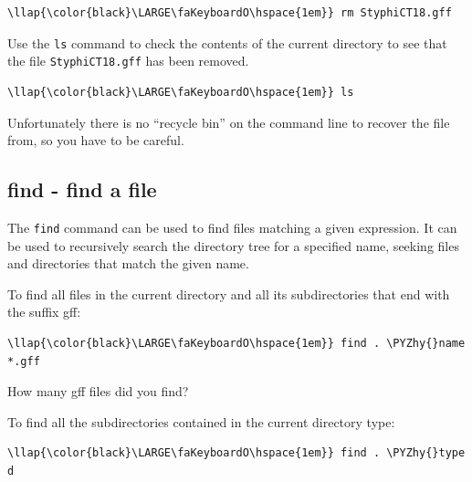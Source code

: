 \documentclass[11pt]{article}
\def\PYZhy{\char`\-}
\begin{document}
\begin{terminalinput}
\begin{Verbatim}[commandchars=\\\{\}]
\llap{\color{black}\LARGE\faKeyboardO\hspace{1em}} rm StyphiCT18.gff
\end{Verbatim}
\end{terminalinput}

    Use the \texttt{ls} command to check the contents of the current
directory to see that the file \texttt{StyphiCT18.gff} has been removed.

\begin{terminalinput}
\begin{Verbatim}[commandchars=\\\{\}]
\llap{\color{black}\LARGE\faKeyboardO\hspace{1em}} ls
\end{Verbatim}
\end{terminalinput}

    Unfortunately there is no ``recycle bin'' on the command line to recover
the file from, so you have to be careful.

    \hypertarget{find---find-a-file}{%
\subsection{find - find a file}\label{find---find-a-file}}

The \texttt{find} command can be used to find files matching a given
expression. It can be used to recursively search the directory tree for
a specified name, seeking files and directories that match the given
name.

    To find all files in the current directory and all its subdirectories
that end with the suffix gff:

\begin{terminalinput}
\begin{Verbatim}[commandchars=\\\{\}]
\llap{\color{black}\LARGE\faKeyboardO\hspace{1em}} find . \PYZhy{}name *.gff
\end{Verbatim}
\end{terminalinput}

    How many gff files did you find?

    To find all the subdirectories contained in the current directory type:

\begin{terminalinput}
\begin{Verbatim}[commandchars=\\\{\}]
\llap{\color{black}\LARGE\faKeyboardO\hspace{1em}} find . \PYZhy{}type d
\end{Verbatim}
\end{terminalinput}
\end{document}
